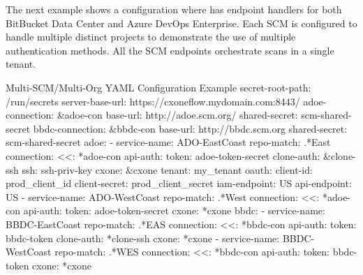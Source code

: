 \pagebreak
The next example shows a configuration where \cxoneflow has endpoint handlers for both
BitBucket Data Center and Azure DevOps Enterprise.  Each SCM is configured to handle multiple distinct
projects to demonstrate the use of multiple authentication methods.  All the SCM endpoints
orchestrate scans in a single \cxone tenant.

\begin{code}{Multi-SCM/Multi-Org YAML Configuration Example}{}{}
secret-root-path: /run/secrets
server-base-url: https://cxoneflow.mydomain.com:8443/
adoe-connection: &adoe-con
    base-url: http://adoe.scm.org/
    shared-secret: scm-shared-secret
bbdc-connection: &bbdc-con
    base-url: http://bbdc.scm.org
    shared-secret: scm-shared-secret
adoe:
    - service-name: ADO-EastCoast
        repo-match: .*East
        connection:
        <<: *adoe-con
        api-auth: 
            token: adoe-token-secret
        clone-auth: &clone-ssh
            ssh: ssh-priv-key
        cxone: &cxone
        tenant: my_tenant
        oauth:
            client-id: prod_client_id
            client-secret: prod_client_secret
        iam-endpoint: US
        api-endpoint: US
    - service-name: ADO-WestCoast
        repo-match: .*West
        connection:
        <<: *adoe-con
        api-auth:
            token: adoe-token-secret
        cxone: *cxone
bbdc:
    - service-name: BBDC-EastCoast
        repo-match: .*EAS
        connection:
        <<: *bbdc-con
        api-auth: 
            token: bbdc-token
        clone-auth: *clone-ssh
        cxone: *cxone
    - service-name: BBDC-WestCoast
        repo-match: .*WES
        connection:
        <<: *bbdc-con
        api-auth:
            token: bbdc-token
        cxone: *cxone
\end{code}

